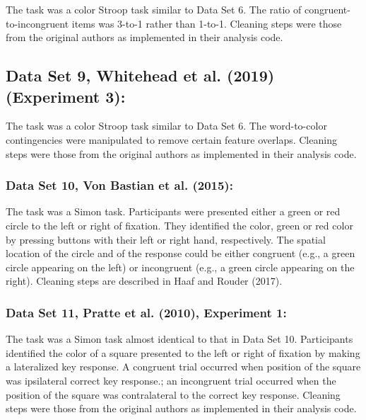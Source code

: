 \documentclass[
  ,man]{apa6}
\begin{document}
The task was a color Stroop task similar to Data Set 6. The ratio of congruent-to-incongruent items was 3-to-1 rather than 1-to-1. Cleaning steps were those from the original authors as implemented in their analysis code.

\hypertarget{data-set-9-whitehead.etal.2019-experiment-3}{%
\subsection{Data Set 9, Whitehead et al. (2019) (Experiment 3):}\label{data-set-9-whitehead.etal.2019-experiment-3}}

The task was a color Stroop task similar to Data Set 6. The word-to-color contingencies were manipulated to remove certain feature overlaps. Cleaning steps were those from the original authors as implemented in their analysis code.

\hypertarget{data-set-10-vonbastian.etal.2015}{%
\subsubsection{Data Set 10, Von Bastian et al. (2015):}\label{data-set-10-vonbastian.etal.2015}}

The task was a Simon task. Participants were presented either a green or red circle to the left or right of fixation. They identified the color, green or red color by pressing buttons with their left or right hand, respectively. The spatial location of the circle and of the response could be either congruent (e.g., a green circle appearing on the left) or incongruent (e.g., a green circle appearing on the right). Cleaning steps are described in Haaf and Rouder (2017).

\hypertarget{data-set-11-pratte.etal.2010-experiment-1}{%
\subsubsection{Data Set 11, Pratte et al. (2010), Experiment 1:}\label{data-set-11-pratte.etal.2010-experiment-1}}

The task was a Simon task almost identical to that in Data Set 10. Participants identified the color of a square presented to the left or right of fixation by making a lateralized key response. A congruent trial occurred when position of the square was ipsilateral correct key response.; an incongruent trial occurred when the position of the square was contralateral to the correct key response. Cleaning steps were those from the original authors as implemented in their analysis code.
\end{document}
